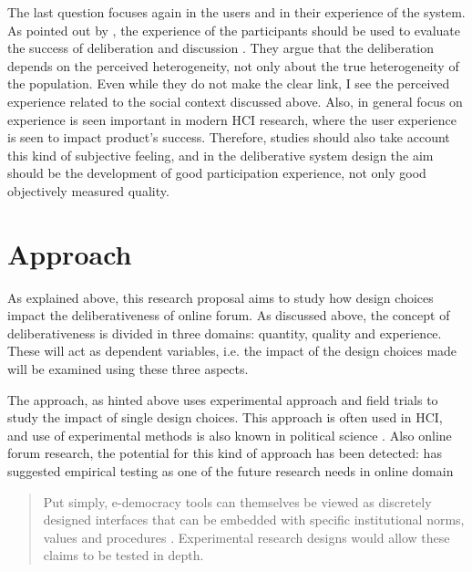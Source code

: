 \documentclass{article}
\begin{document}
The last question focuses again in the users and in their experience of the system. As pointed out by , the experience of the participants should be used to evaluate the success of deliberation and discussion . They argue that the deliberation depends on the perceived heterogeneity, not only about the true heterogeneity of the population. Even while they do not make the clear link, I see the perceived experience related to the social context discussed above. Also, in general focus on experience is seen important in modern HCI research, where the user experience is seen to impact product's success. Therefore, studies should also take account this kind of subjective feeling, and in the deliberative system design the aim should be the development of good participation experience, not only good objectively measured quality.

\section{Approach}

As explained above, this research proposal aims to study how design choices impact the deliberativeness of online forum. As discussed above, the concept of deliberativeness is divided in three domains: quantity, quality and experience. These will act as dependent variables, i.e. the impact of the design choices made will be examined using these three aspects.

The approach, as hinted above uses experimental approach and field trials to study the impact of single design choices. This approach is often used in HCI, and use of experimental methods is also known in political science \cite{brown11,green03,stoker10}. Also online forum research, the potential for this kind of approach has been detected:  has suggested empirical testing as one of the future research needs in online domain

\begin{quote}
Put simply, e-democracy tools can themselves be viewed as discretely designed interfaces that can be embedded with specific institutional norms, values and procedures \cite{wright07}. Experimental research designs would allow these claims to be tested in depth.
\end{quote}
\end{document}
